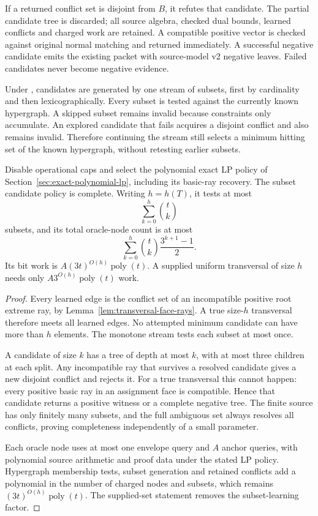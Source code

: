 If a returned conflict set is disjoint from $B$, it refutes that
candidate.  The partial candidate tree is discarded; all source algebra,
checked dual bounds, learned conflicts and charged work are retained.
A compatible positive vector is checked against original normal matching
and returned immediately.  A successful negative candidate emits the
existing  packet with source-model v2
negative leaves.  Failed candidates never become negative evidence.

Under , candidates are generated by one
stream of subsets, first by cardinality
and then lexicographically.  Every subset is tested against the currently
known hypergraph.  A skipped subset remains invalid because constraints
only accumulate.  An explored candidate that fails acquires a disjoint
conflict and also remains invalid.  Therefore continuing the stream
still selects a minimum hitting set of the known hypergraph, without
retesting earlier subsets.

\begin{proposition}
\label{thm:transversal-learning-bound}
Disable operational caps and select the polynomial exact LP policy of
Section~\ref{sec:exact-polynomial-lp}, including its basic-ray recovery.
The subset candidate policy is complete.
Writing $h=h(T)$, it tests at most
\[
 \sum_{k=0}^{h}\binom tk
\]
subsets, and its total oracle-node count is at most
\[
 \sum_{k=0}^{h}\binom tk\frac{3^{k+1}-1}{2}.
\]
Its bit work is $A(3t)^{O(h)}\operatorname{poly}(t)$.  A supplied uniform transversal
of size $h$ needs only $A3^{O(h)}\operatorname{poly}(t)$ work.
\end{proposition}
\begin{proof}
Every learned edge is the conflict set of an incompatible positive
root extreme ray, by Lemma~\ref{lem:transversal-face-rays}.  A true
size-$h$ transversal therefore meets all learned edges.  No attempted
minimum candidate can have more than $h$ elements.  The monotone stream
tests each subset at most once.

A candidate of size $k$ has a tree of depth at most $k$, with at most
three children at each split.  Any incompatible ray that survives a
resolved candidate gives a new disjoint conflict and rejects it.  For
a true transversal this cannot happen: every positive basic ray in
an assignment face is compatible.  Hence that candidate returns a
positive witness or a complete negative tree.  The finite source has
only finitely many subsets, and the full ambiguous set always resolves
all conflicts, proving completeness independently of a small parameter.

Each oracle node uses at most one envelope query and $A$ anchor queries,
with polynomial source arithmetic and proof data under the stated LP
policy.  Hypergraph membership tests, subset generation and retained
conflicts add a polynomial in the number of charged nodes and subsets,
which remains $(3t)^{O(h)}\operatorname{poly}(t)$.  The supplied-set statement removes
the subset-learning factor.
\end{proof}

